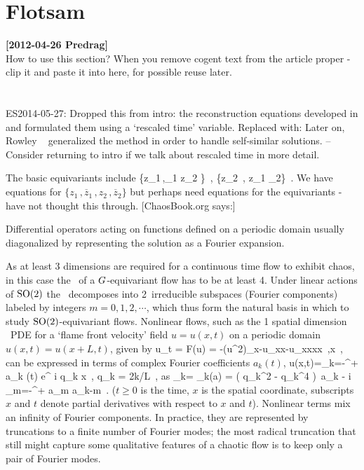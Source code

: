 
\section{Flotsam}
\label{s:flotsam}

\noindent
{\bf [2012-04-26 Predrag]}
\\
How to use this section? When you remove cogent text from the article
proper - clip  it and paste it into here, for possible reuse later.
\\\\\\

ES2014-05-27: Dropped this from intro: the reconstruction equations
developed in  and formulated them using a `rescaled
time' variable. Replaced with: Later on, Rowley \etal~
generalized the method in order to handle self-similar solutions. -- Consider returning
to intro if we talk about rescaled time in more detail.



The basic equivariants include
\beq
  \{{z}_1\,,_1 {z}_2 \}
            \,,\qquad
  \{{z}_2 \,, z_1 _2\}
\,.
\eeq
We have equations  for $\{{z}_1\,,\overline{z}_1\,,
{z}_2\,,\overline{z}_2 \}$ but perhaps need equations for the
equivariants  - have not thought this through.
[ChaosBook.org says:]

Differential operators acting on functions defined on a periodic domain
usually diagonalized by representing the solution as a Fourier expansion.

As at least 3 dimensions are required for a continuous time flow to
exhibit chaos, in this case the \statesp\ of a $G$-equivariant flow
has to be at least 4\dmn. Under linear actions of $\textrm{SO}(2)$ the \statesp\
decomposes into 2\dmn\ irreducible subspaces (Fourier components) labeled
by integers $m = 0,1,2,\cdots$, which thus form the natural basis in which
to study $\textrm{SO}(2)$-equivariant flows. Nonlinear flows, such as the
1 spatial dimension \KS\ PDE for a `flame front velocity' field
$u=u(x,t)$ on a periodic domain $u(x,t) = u(x+L,t)$, given by
\beq
  u_t = F(u) = -{\textstyle{}}(u^2)_x-u_{xx}-u_{xxxx}
    \,,\qquad   x \in [-L/2,L/2]
    \,,
can be
expressed in terms of complex Fourier coefficients $a_k(t)$,
\beq
  u(x,t)=\sum_{k=-\infty}^{+\infty} a_k (t) e^{ i q_k x}
\,,\qquad
  q_k = 2\pi k/L
\,,
as
\beq
{}_k= \pVeloc_k(a)
     = ( q_k^2 - q_k^4 )\, a_k
    - i  \sum_{m=-\infty}^{+\infty} a_m a_{k-m}
\,.
($t \geq 0$ is the time, $x$ is the spatial coordinate, subscripts $x$
and $t$ denote partial derivatives with respect to $x$ and $t$).
Nonlinear terms mix an infinity of
Fourier components. In practice, they are represented by truncations to
a finite number of Fourier modes; the most radical truncation that
still might capture some qualitative features of a chaotic flow is to keep
only a pair of Fourier modes.



